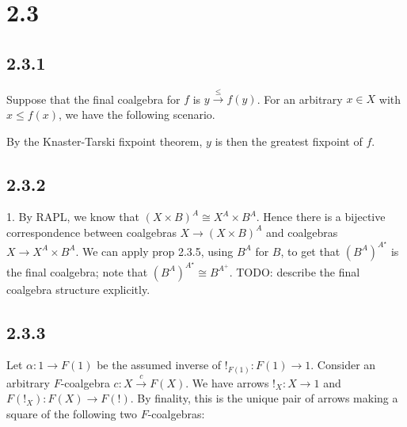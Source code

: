 \documentclass{article}
\begin{document}
\section*{2.3}

\subsection*{2.3.1}

Suppose that the final coalgebra for $f$ is $y \overset{\leq}{\longrightarrow} f(y)$.
For an arbitrary $x \in X$ with $x \leq f(x)$, we have the following scenario. 

\begin{center}
\end{center}

By the Knaster-Tarski fixpoint theorem, $y$ is then the greatest fixpoint of $f$.

\subsection*{2.3.2}

1. By RAPL, we know that $(X \times B)^A \cong X^A \times B^A$. Hence there is a bijective correspondence between
coalgebras $X \to (X \times B)^A$ and coalgebras $X \to X^A \times B^A$. We can apply prop 2.3.5, using 
$B^A$ for $B$, to get that $(B^A)^{A^{\star}}$ is the final coalgebra; note that $(B^A)^{A^{\star}} \cong B^{A^+}$.
TODO: describe the final coalgebra structure explicitly.

\subsection*{2.3.3}

Let $\alpha : 1 \to F(1)$ be the assumed inverse of $!_{F(1)} : F(1) \to 1$.
Consider an arbitrary $F$-coalgebra $c : X \overset{c}{\longrightarrow} F(X)$. We have arrows
$!_X : X \to 1$ and $F(!_X) : F(X) \to F(!)$. By finality, this is the unique pair
of arrows making a square of the following two $F$-coalgebras:

\begin{center}
\end{center}
\end{document}
